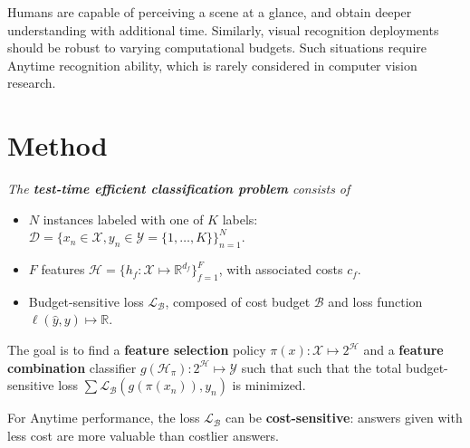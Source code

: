 
Humans are capable of perceiving a scene at a glance, and obtain deeper understanding with additional time.
Similarly, visual recognition deployments should be robust to varying computational budgets.
Such situations require Anytime recognition ability, which is rarely considered in computer vision research.

\section{Method}
{\itshape
The \textbf{test-time efficient classification problem} consists of
\vspace{-.5em}
\begin{itemize}
\addtolength{\itemsep}{-.55\baselineskip}
\item
$N$ instances labeled with one of $K$ labels: ${\mathcal{D} = \{x_n \in \mathcal{X}, y_n \in \mathcal{Y} = \{1, \dots, K\}\}_{n=1}^N}$.

\item
$F$ features $\mathcal{H} = \{h_f : \mathcal{X} \mapsto \mathbb{R}^{d_f} \}_{f=1}^F$, with associated costs $c_f$.

\item Budget-sensitive loss $\mathcal{L}_\mathcal{B}$, composed of cost budget $\mathcal{B}$ and loss function ${\ell(\hat{y}, y) \mapsto \mathbb{R}}$.
\end{itemize}

The goal is to find a \textbf{feature selection} policy $\pi(x): \mathcal{X} \mapsto 2^\mathcal{H}$ and a \textbf{feature combination} classifier $g(\mathcal{H}_\pi) : 2^\mathcal{H} \mapsto \mathcal{Y}$ such that such that the total budget-sensitive loss $\sum \mathcal{L}_\mathcal{B}(g(\pi(x_n)), y_n)$ is minimized.
}

For Anytime performance, the loss $\mathcal{L}_\mathcal{B}$ can be \textbf{cost-sensitive}: answers given with less cost are more valuable than costlier answers.

